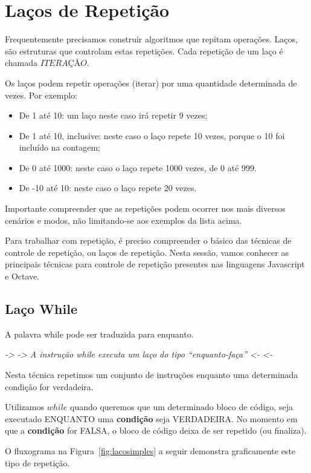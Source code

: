 \chapter{Laços de Repetição}
\label{cap:lacos}

Frequentemente precisamos construir algoritmos que repitam operações. Laços, são estruturas que controlam estas repetições. Cada repetição de um laço é chamada $ITERAÇÃO$.

Os laços podem repetir operações (iterar) por uma quantidade determinada de vezes. Por exemplo:
\begin{itemize}
  \item De 1 até 10: um laço neste caso irá repetir 9 vezes;
  \item De 1 até 10, inclusive: neste caso o laço repete 10 vezes, porque o 10 foi incluído na contagem;
  \item De 0 até 1000: neste caso o laço repete 1000 vezes, de 0 até 999.
  \item De -10 até 10: neste caso o laço repete 20 vezes.
\end{itemize}

Importante compreender que as repetições podem ocorrer nos mais diversos cenários e modos, não limitando-se aos exemplos da lista acima.

Para trabalhar com repetição, é preciso compreender o básico das técnicas de controle de repetição, ou laços de repetição. Nesta sessão, vamos conhecer as principais técnicas para controle de repetição presentes nas linguagens Javascript e Octave.


\section{Laço While}
\label{sec:while}
A palavra while pode ser traduzida para enquanto.

\emph{-> -> A instrução while executa um laço do tipo “enquanto-faça”   <- <-}

Nesta técnica repetimos um conjunto de instruções enquanto uma determinada condição for verdadeira. 

Utilizamos $while$ quando queremos que um determinado bloco de código, seja executado ENQUANTO uma \textbf{condição} seja VERDADEIRA. No momento em que a \textbf{condição} for FALSA, o bloco de código deixa de ser repetido (ou finaliza).

O fluxograma na Figura~\ref{fig:lacosimples} a seguir demonstra graficamente este tipo de repetição.

